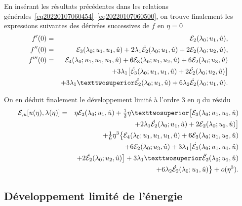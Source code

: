 \documentclass[12pt, final]{amsart}
\begin{document}
En insérant les résultats précédentes dans les relations
générales~\eqref{eq20220107060454}--\eqref{eq20220107060500}, on trouve
finalement les expressions suivantes des dérivées successives de \(f\) en
\(\eta =0\)
\begin{eqnarray}
  f'(0)
  &=&\mathcal E_2(\lambda _0; u_1, \hat{u}),\\
  f''(0)
  &=&\mathcal E_3(\lambda _0; u_1, u_1, \hat{u})
    +2\lambda _1\dot{\mathcal E_2}(\lambda _0; u_1, \hat{u})
    +2\mathcal E_2(\lambda _0; u_2, \hat{u}),\\
  \notag
  f'''(0)
  &=&\mathcal E_4(\lambda _0; u_1, u_1, u_1, \hat{u})
      +6\mathcal E_3(\lambda _0; u_1, u_2, \hat{u})
    +6\mathcal E_2(\lambda _0; u_3, \hat{u})\\
  \notag
  &&+3\lambda _1\bigl[\dot{\mathcal E_3}(\lambda _0; u_1, u_1, \hat{u})
     +2\dot{\mathcal E_2}(\lambda _0; u_2, \hat{u})\bigr]\\
  &&+3\lambda _1²\ddot{\mathcal E_2}(\lambda _0; u_1, \hat{u})
     +6\lambda _2\dot{\mathcal E_2}(\lambda _0; u_1, \hat{u}).
\end{eqnarray}

On en déduit finalement le développement limité à l'ordre 3 en \(\eta \) du résidu
\begin{eqnarray}
    \mathcal E_{,u}[u(\eta ), \lambda (\eta )]
    &=&\eta \mathcal E_2(\lambda _0; u_1, \hat{u})
    +\tfrac12\eta ²\bigl[\mathcal E_3(\lambda _0; u_1, u_1, \hat{u})\\
    \notag
    &&+2\lambda _1\dot{\mathcal E_2}(\lambda _0; u_1, \hat{u})
    +2\mathcal E_2(\lambda _0; u_2, \hat{u})\bigr]\\
    \notag
    &&+\tfrac16\eta ^3\bigl\{
    \mathcal E_4(\lambda _0; u_1, u_1, u_1, \hat{u})
    +6\mathcal E_3(\lambda _0; u_1, u_2, \hat{u})\\
    \notag
    &&+6\mathcal E_2(\lambda _0; u_3, \hat{u})
    +3\lambda _1\bigl[\dot{\mathcal E_3}(\lambda _0; u_1, u_1, \hat{u})\\
    \notag
    &&+2\dot{\mathcal E_2}(\lambda _0; u_2, \hat{u})\bigr]
    +3\lambda _1²\ddot{\mathcal E_2}(\lambda _0; u_1, \hat{u})\\
    \label{eq20220107080901}
    &&+6\lambda _2\dot{\mathcal E_2}(\lambda _0; u_1, \hat{u})\bigr\}
    +o(\eta ^3).
\end{eqnarray}

\subsection{Développement limité de l'énergie}
\label{sec20220121172919}
\end{document}
